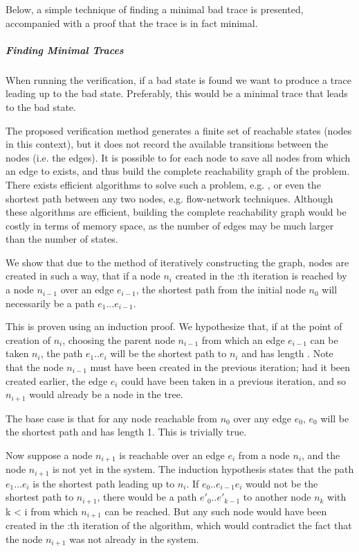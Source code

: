 Below, a simple technique of finding a minimal bad trace is presented, accompanied with a proof that the trace is in fact minimal.

\subparagraph{Finding Minimal Traces}
When running the verification, if a bad state is found we want to produce a trace leading up to the bad state. Preferably, this would be a minimal trace that leads to the bad state.

The proposed verification method generates a finite set of reachable states (nodes in this context), but it does not record the available transitions between the nodes (i.e. the edges). It is possible to for each node  to save all nodes  from which an edge to  exists, and thus build the complete reachability graph of the problem. There exists efficient algorithms to solve such a problem, e.g. , or even the shortest path between any two nodes, e.g. flow-network techniques. Although these algorithms are efficient, building the complete reachability graph would be costly in terms of memory space, as the number of edges may be much larger than the number of states.


We show that due to the method of iteratively constructing the graph, nodes are created in such a way, that if a node $n_{i}$ created in the :th iteration is reached by a node $n_{i-1}$ over an edge $e_{i-1}$, the shortest path from the initial node $n_0$ will necessarily be a path $e_1...e_{i-1}$.

 This is proven using an induction proof. We hypothesize that, if at the point of creation of $n_i$, choosing the parent node $n_{i-1}$ from which an edge $e_{i-1}$ can be taken $n_i$, the path $e_1..e_{i}$ will be the shortest path to $n_i$ and has length . Note that the node $n_{i-1}$ must have been created in the previous iteration; had it been created earlier, the edge $e_i$ could have been taken in a previous iteration, and so $n_{i+1}$ would already be a node in the tree.

The base case is that for any node reachable from $n_0$ over any edge $e_0$, $e_0$ will be the shortest path and has length 1. This is trivially true.

Now suppose a node $n_{i+1}$ is reachable over an edge $e_i$ from a node $n_i$, and the node $n_{i+1}$ is not yet in the system. The induction hypothesis states that the path $e_1...e_i$ is the shortest path leading up to $n_i$. If $e_0..e_{i-1}e_i$ would not be the shortest path to $n_{i+1}$, there would be a path $e'_0..e'_{k-1}$ to another node $n_k$ with k < i from which $n_{i+1}$ can be reached. But any such node would have been created in the :th iteration of the algorithm, which would contradict the fact that the node $n_{i+1}$ was not already in the system.

